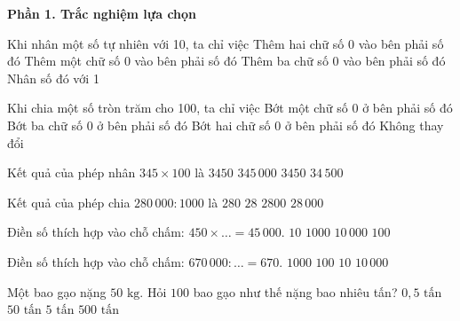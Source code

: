 \textbf{Phần 1. Trắc nghiệm lựa chọn}

\begin{ex} %
Khi nhân một số tự nhiên với 10, ta chỉ việc
\choice
{Thêm hai chữ số 0 vào bên phải số đó}
{\True Thêm một chữ số 0 vào bên phải số đó}
{Thêm ba chữ số 0 vào bên phải số đó}
{Nhân số đó với 1}
\end{ex}

\begin{ex} %
Khi chia một số tròn trăm cho 100, ta chỉ việc
\choice
{Bớt một chữ số 0 ở bên phải số đó}
{Bớt ba chữ số 0 ở bên phải số đó}
{\True Bớt hai chữ số 0 ở bên phải số đó}
{Không thay đổi}
\end{ex}

\begin{ex} %
Kết quả của phép nhân $345 \times 100$ là
\choice
{$3450$}
{$345\,000$}
{$3450$}
{\True $34\,500$}
\end{ex}

\begin{ex} %
Kết quả của phép chia $280\,000 : 1000$ là
\choice
{\True $280$}
{$28$}
{$2800$}
{$28\,000$}
\end{ex}

\begin{ex} %
Điền số thích hợp vào chỗ chấm: $450 \times \dots = 45\,000$.
\choice
{$10$}
{$1000$}
{$10\,000$}
{\True $100$}
\end{ex}

\begin{ex} %
Điền số thích hợp vào chỗ chấm: $670\,000 : \dots = 670$.
\choice
{\True $1000$}
{$100$}
{$10$}
{$10\,000$}
\end{ex}

\begin{ex} %
Một bao gạo nặng $50\text{ kg}$. Hỏi $100$ bao gạo như thế nặng bao nhiêu tấn?
\choice
{$0{,}5\text{ tấn}$}
{$50\text{ tấn}$}
{\True $5\text{ tấn}$}
{$500\text{ tấn}$}
\end{ex}


